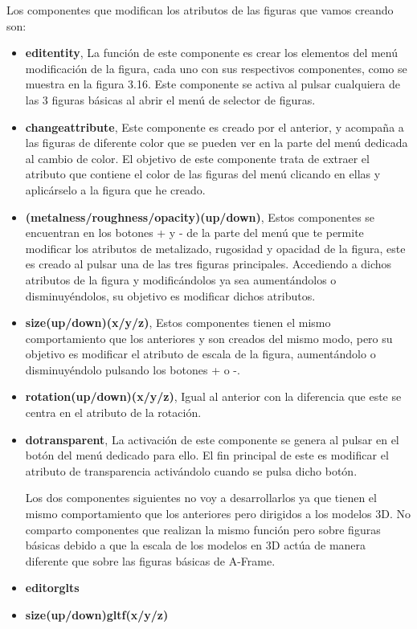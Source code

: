\documentclass[a4paper, 12pt]{book}
\begin{document}
Los componentes que modifican los atributos de las figuras que vamos creando son:
\begin{itemize}
    \item \textbf{editentity}, La función de este componente es crear los elementos del menú modificación de la figura, cada uno con sus respectivos componentes, como se muestra en la figura 3.16. Este componente se activa al pulsar cualquiera de las 3 figuras básicas al abrir el menú de selector de figuras. 
    
    \item \textbf{changeattribute}, Este componente es creado por el anterior, y acompaña a las figuras de diferente color que se pueden ver en la parte del menú dedicada al cambio de color. El objetivo de este componente trata de extraer el atributo que contiene el color de las figuras del menú clicando en ellas y aplicárselo a la figura que he creado. 
    
    \item \textbf{(metalness/roughness/opacity)(up/down)}, Estos componentes se encuentran en los botones + y - de la parte del menú que te permite modificar los atributos de metalizado, rugosidad y opacidad de la figura, este es creado al pulsar una de las tres figuras principales. Accediendo a dichos atributos de la figura y modificándolos ya sea aumentándolos o disminuyéndolos, su objetivo es modificar dichos atributos.
    
    \item \textbf{size(up/down)(x/y/z)}, Estos componentes tienen el mismo comportamiento que los anteriores y son creados del mismo modo, pero su objetivo es modificar el atributo de escala de la figura, aumentándolo o disminuyéndolo pulsando los botones + o -.
    
    \item \textbf{rotation(up/down)(x/y/z)}, Igual al anterior con la diferencia que este se centra en el atributo de la rotación.
    
    \item \textbf{dotransparent}, La activación de este componente se genera al pulsar en el botón del menú dedicado para ello. El fin principal de este es modificar el atributo de transparencia  activándolo cuando se pulsa dicho botón.
    
    Los dos componentes siguientes no voy a desarrollarlos ya que tienen el mismo comportamiento que los anteriores pero dirigidos a los modelos 3D. No comparto componentes que realizan la mismo función pero sobre figuras básicas debido a que la escala de los modelos en 3D actúa de manera diferente que sobre las figuras básicas de A-Frame.
    \item \textbf{editorglts}
    \item \textbf{size(up/down)gltf(x/y/z)}
\end{itemize}
\end{document}
